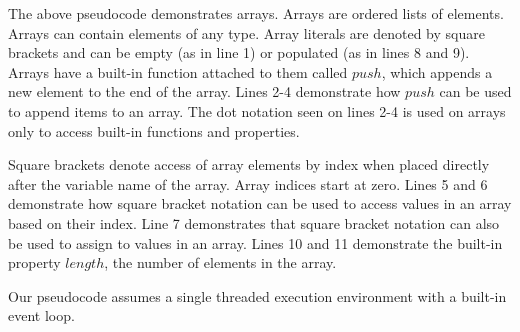 The above pseudocode demonstrates arrays. Arrays are ordered lists of elements. Arrays can contain elements of any type. Array literals are denoted by square brackets and can be empty (as in line 1) or populated (as in lines 8 and 9). Arrays have a built-in function attached to them called $push$, which appends a new element to the end of the array. Lines 2-4 demonstrate how $push$ can be used to append items to an array. The dot notation seen on lines 2-4 is used on arrays only to access built-in functions and properties.

Square brackets denote access of array elements by index when placed directly after the variable name of the array. Array indices start at zero. Lines 5 and 6 demonstrate how square bracket notation can be used to access values in an array based on their index. Line 7 demonstrates that square bracket notation can also be used to assign to values in an array. Lines 10 and 11 demonstrate the built-in property $length$, the number of elements in the array.




\begin{codebox}
\end{codebox}
Our pseudocode assumes a single threaded execution environment with a built-in event loop.
